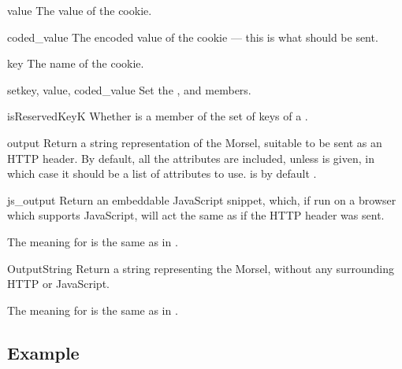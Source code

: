 \begin{memberdesc}[Morsel]{value}
The value of the cookie.
\end{memberdesc}

\begin{memberdesc}[Morsel]{coded_value}
The encoded value of the cookie --- this is what should be sent.
\end{memberdesc}

\begin{memberdesc}[Morsel]{key}
The name of the cookie.
\end{memberdesc}

\begin{methoddesc}[Morsel]{set}{key, value, coded_value}
Set the ,  and  members.
\end{methoddesc}

\begin{methoddesc}[Morsel]{isReservedKey}{K}
Whether  is a member of the set of keys of a .
\end{methoddesc}

\begin{methoddesc}[Morsel]{output}{}
Return a string representation of the Morsel, suitable
to be sent as an HTTP header. By default, all the attributes are included,
unless  is given, in which case it should be a list of attributes
to use.  is by default .
\end{methoddesc}

\begin{methoddesc}[Morsel]{js_output}{}
Return an embeddable JavaScript snippet, which, if run on a browser which
supports JavaScript, will act the same as if the HTTP header was sent.

The meaning for  is the same as in .
\end{methoddesc}

\begin{methoddesc}[Morsel]{OutputString}{}
Return a string representing the Morsel, without any surrounding HTTP
or JavaScript.

The meaning for  is the same as in .
\end{methoddesc}
                

\subsection{Example \label{cookie-example}}


